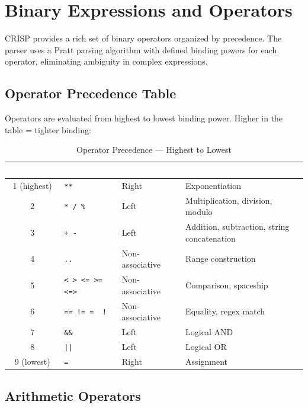 \section{Binary Expressions and Operators}

CRISP provides a rich set of binary operators organized by precedence. The parser uses a Pratt parsing algorithm with defined binding powers for each operator, eliminating ambiguity in complex expressions.

\subsection{Operator Precedence Table}

Operators are evaluated from highest to lowest binding power. Higher in the table = tighter binding:

\begin{table}[H]
\centering
{}
\caption{\textcolor{darkpurple}{Operator Precedence — Highest to Lowest}}
\vspace{0.3em}
\begin{tabular}{@{}cllp{5cm}@{}}
\toprule
\rowcolor{softvioletdark}
\textbf{\textcolor{white}{Precedence}} & \textbf{\textcolor{white}{Operators}} & \textbf{\textcolor{white}{Associativity}} & \textbf{\textcolor{white}{Description}} \\
\midrule
1 (highest) & \texttt{**} & Right & Exponentiation \\
2 & \texttt{* / \%} & Left & Multiplication, division, modulo \\
3 & \texttt{+ -} & Left & Addition, subtraction, string concatenation \\
4 & \texttt{..} & Non-associative & Range construction \\
5 & \texttt{< > <= >= <=>} & Non-associative & Comparison, spaceship \\
6 & \texttt{== != =~ !~} & Non-associative & Equality, regex match \\
7 & \texttt{\&\&} & Left & Logical AND \\
8 & \texttt{||} & Left & Logical OR \\
9 (lowest) & \texttt{=} & Right & Assignment \\
\bottomrule
\end{tabular}
\end{table}

\subsection{Arithmetic Operators}

